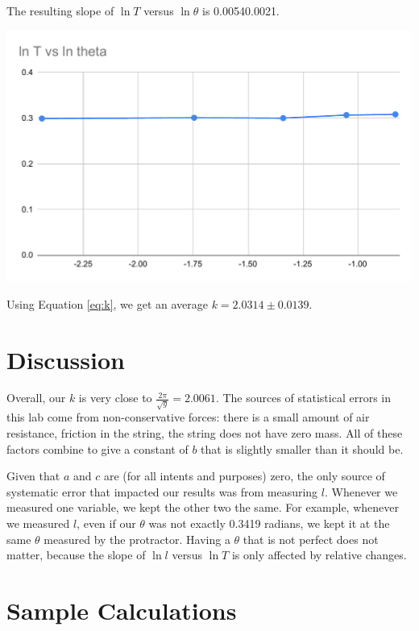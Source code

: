 \documentclass[12pt]{article}
\begin{document}
The resulting slope of \(\ln T\) versus \(\ln \theta\) is 0.0054\textpm{}0.0021.

\begin{center}
\includegraphics[width=6.5in]{./tvt.pdf}
\end{center}

Using Equation \ref{eq:k}, we get an average \(k = 2.0314\pm0.0139\).
\section{Discussion}
\label{sec:org03fa51b}

Overall, our \(k\) is very close to \(\frac{2\pi}{\sqrt{g}} = 2.0061\). The sources of statistical errors in this lab come from non-conservative forces: there is a small amount of air resistance, friction in the string, the string does not have zero mass. All of these factors combine to give a constant of \(b\) that is slightly smaller than it should be.

Given that \(a\) and \(c\) are (for all intents and purposes) zero, the only source of systematic error that impacted our results was from measuring \(l\). Whenever we measured one variable, we kept the other two the same. For example, whenever we measured \(l\), even if our \(\theta\) was not exactly 0.3419 radians, we kept it at the same \(\theta\) measured by the protractor. Having a \(\theta\) that is not perfect does not matter, because the slope of \(\ln l\) versus \(\ln T\) is only affected by relative changes.
\section{Sample Calculations}
\label{sec:org4ac2d24}
\end{document}
